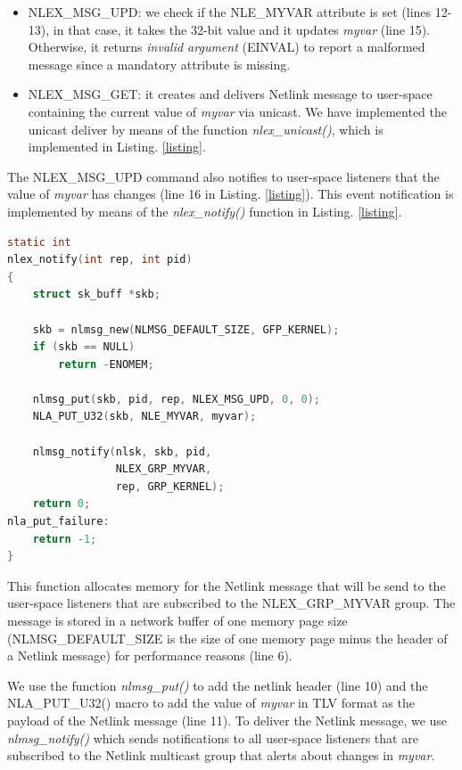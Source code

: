 \documentclass[10pt,onecolumn]{article}
\begin{document}
\begin{itemize}
  \item NLEX\_MSG\_UPD: we check if the NLE\_MYVAR attribute is set (lines 12-13), in that case, it takes the 32-bit value and it updates \textit{myvar} (line 15). Otherwise, it returns \textit{invalid argument} (EINVAL) to report a malformed message since a mandatory attribute is missing.
  \item NLEX\_MSG\_GET: it creates and delivers Netlink message to user-space containing the current value of \textit{myvar} via unicast. We have implemented the unicast deliver by means of the function \textit{nlex\_unicast()}, which is implemented in Listing. \ref{listing}.
\end{itemize}

The NLEX\_MSG\_UPD command also notifies to user-space listeners that the value of \textit{myvar} has changes (line 16 in Listing. \ref{listing}). This event notification is implemented by means of the  \textit{nlex\_notify()} function in Listing. \ref{listing}.

\begin{lstlisting}[language=C, caption=Broadcast notification of changes in myvar, label=listing5]
static int
nlex_notify(int rep, int pid)
{
    struct sk_buff *skb;

    skb = nlmsg_new(NLMSG_DEFAULT_SIZE, GFP_KERNEL);
    if (skb == NULL)
        return -ENOMEM;

    nlmsg_put(skb, pid, rep, NLEX_MSG_UPD, 0, 0);
    NLA_PUT_U32(skb, NLE_MYVAR, myvar);

    nlmsg_notify(nlsk, skb, pid,
                 NLEX_GRP_MYVAR,
                 rep, GRP_KERNEL);
    return 0;
nla_put_failure:
    return -1;
}
\end{lstlisting}

This function allocates memory for the Netlink message that will be send to the user-space listeners that are subscribed to the NLEX\_GRP\_MYVAR group. The message is stored in a network buffer of one memory page size (NLMSG\_DEFAULT\_SIZE is the size of one memory page minus the header of a Netlink message) for performance reasons (line 6).

We use the function \textit{nlmsg\_put()} to add the netlink header (line 10) and the NLA\_PUT\_U32() macro to add the value of \textit{myvar} in TLV format as the payload of the Netlink message (line 11). To deliver the Netlink message, we use \textit{nlmsg\_notify()} which sends notifications to all user-space listeners that are subscribed to the Netlink multicast group that alerts about changes in \textit{myvar}.
\end{document}

